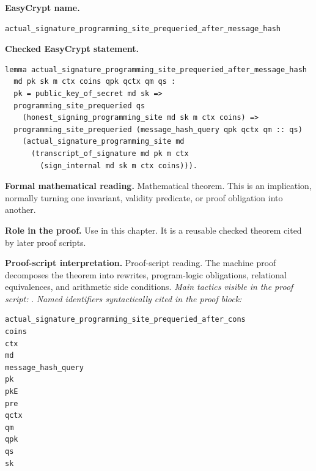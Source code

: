 \begin{formaltheorem}
\noindent\textbf{EasyCrypt name.}
\begin{lstlisting}[language=EasyCrypt,basicstyle=\ttfamily\scriptsize]
actual_signature_programming_site_prequeried_after_message_hash
\end{lstlisting}
\noindent\textbf{Checked EasyCrypt statement.}
\begin{lstlisting}[language=EasyCrypt,basicstyle=\ttfamily\scriptsize]
lemma actual_signature_programming_site_prequeried_after_message_hash
  md pk sk m ctx coins qpk qctx qm qs :
  pk = public_key_of_secret md sk =>
  programming_site_prequeried qs
    (honest_signing_programming_site md sk m ctx coins) =>
  programming_site_prequeried (message_hash_query qpk qctx qm :: qs)
    (actual_signature_programming_site md
      (transcript_of_signature md pk m ctx
        (sign_internal md sk m ctx coins))).
\end{lstlisting}
\noindent\textbf{Formal mathematical reading.}
Mathematical theorem. This is an implication, normally turning one invariant, validity predicate, or proof obligation into another.

\noindent\textbf{Role in the proof.}
Use in this chapter. It is a reusable checked theorem cited by later proof scripts.

\noindent\textbf{Proof-script interpretation.}
Proof-script reading. The machine proof decomposes the theorem into rewrites, program-logic obligations, relational equivalences, and arithmetic side conditions.
\emph{Main tactics visible in the proof script:} .
\emph{Named identifiers syntactically cited in the proof block:}
\begin{lstlisting}[language=EasyCrypt,basicstyle=\ttfamily\scriptsize]
actual_signature_programming_site_prequeried_after_cons
coins
ctx
md
message_hash_query
pk
pkE
pre
qctx
qm
qpk
qs
sk
\end{lstlisting}

\end{formaltheorem}

